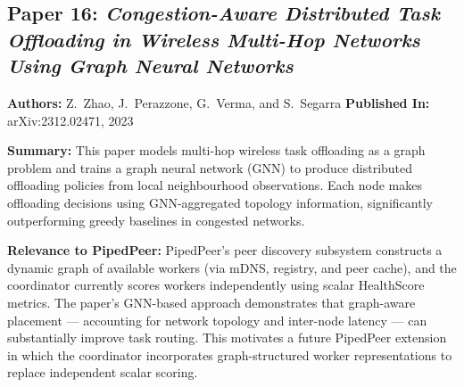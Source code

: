 \subsection*{Paper 16: \textit{Congestion-Aware Distributed Task Offloading in
Wireless Multi-Hop Networks Using Graph Neural Networks}}
\textbf{Authors:} Z.~Zhao, J.~Perazzone, G.~Verma, and S.~Segarra \quad
\textbf{Published In:} arXiv:2312.02471, 2023~\cite{zhao2023}

\noindent\textbf{Summary:}
This paper models multi-hop wireless task offloading as a graph problem and trains
a graph neural network (GNN) to produce distributed offloading policies from local
neighbourhood observations. Each node makes offloading decisions using
GNN-aggregated topology information, significantly outperforming greedy baselines in
congested networks.

\noindent\textbf{Relevance to PipedPeer:}
PipedPeer's peer discovery subsystem constructs a dynamic graph of available workers
(via mDNS, registry, and peer cache), and the coordinator currently scores workers
independently using scalar HealthScore metrics. The paper's GNN-based approach
demonstrates that graph-aware placement — accounting for network topology and
inter-node latency — can substantially improve task routing. This motivates a future
PipedPeer extension in which the coordinator incorporates graph-structured worker
representations to replace independent scalar scoring.
